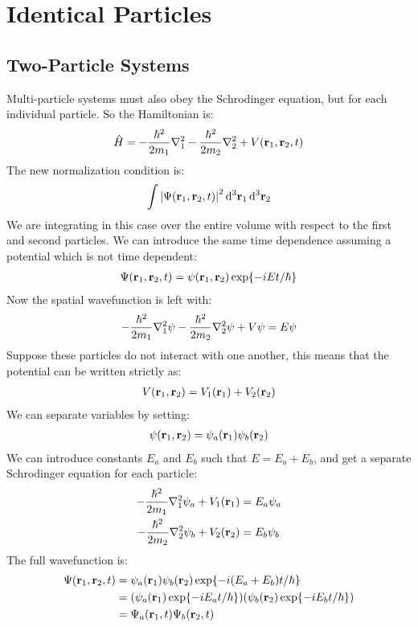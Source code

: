 \section{Identical Particles}
\subsection{Two-Particle Systems}
Multi-particle systems must also obey the Schrodinger equation, but for each individual particle. So the Hamiltonian is:
\begin{align*}
  \hat{H}=-\dfrac{\hbar^2}{2m_1}\laplacian_1-\dfrac{\hbar^2}{2m_2}\laplacian_2
  +V(\vb{r}_1,\vb{r}_2,t)
\end{align*}
The new normalization condition is:
\begin{align*}
  \int\abs{\Psi(\vb{r}_1,\vb{r}_2,t)}^2\dd[3]{\vb{r}_1}\dd[3]{\vb{r}_2}
\end{align*}
We are integrating in this case over the entire volume with respect to the first and second particles. We can introduce the same time dependence assuming a potential which is not time dependent:
\begin{align*}
  \Psi(\vb{r}_1,\vb{r}_2,t)=\psi(\vb{r}_1,\vb{r}_2)\exp{-iEt/\hbar}
\end{align*}
Now the spatial wavefunction is left with:
\begin{align*}
  -\dfrac{\hbar^2}{2m_1}\laplacian_1\psi-\dfrac{\hbar^2}{2m_2}\laplacian_2\psi+V\psi=E\psi
\end{align*}
Suppose these particles do not interact with one another, this means that the potential can be written strictly as:
\begin{align*}
  V(\vb{r}_1,\vb{r}_2)=V_1(\vb{r}_1)+V_2(\vb{r}_2)
\end{align*}
We can separate variables by setting:
\begin{align*}
  \psi(\vb{r}_1,\vb{r}_2)=\psi_a(\vb{r}_1)\psi_b(\vb{r}_2)
\end{align*}
We can introduce constants $E_a$ and $E_b$ such that $E=E_a+E_b$, and get a separate Schrodinger equation for each particle:
\begin{align*}
  -\dfrac{\hbar^2}{2m_1}\laplacian_1\psi_a+V_1(\vb{r}_1)&=E_a\psi_a\\
  -\dfrac{\hbar^2}{2m_2}\laplacian_2\psi_b+V_2(\vb{r}_2)&=E_b\psi_b
\end{align*}
The full wavefunction is:
\begin{align*}
  \Psi(\vb{r}_1,\vb{r}_2,t)&=\psi_a(\vb{r}_1)\psi_b(\vb{r}_2)\exp{-i(E_a+E_b)t/\hbar}\\
  &=\qty(\psi_a(\vb{r}_1)\exp{-iE_at/\hbar})\qty(\psi_b(\vb{r}_2)\exp{-iE_bt/\hbar})\\
  &=\Psi_a(\vb{r}_1,t)\Psi_b(\vb{r}_2,t)
\end{align*}
